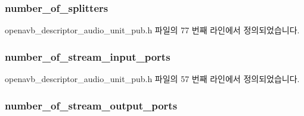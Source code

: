 \subsubsection[{\texorpdfstring{number\+\_\+of\+\_\+splitters}{number_of_splitters}}]{ number\+\_\+of\+\_\+splitters}\hypertarget{structopenavb__aem__descriptor__audio__unit__t_ac9c0b78b7351ae9f7719d899e40355d2}{}\label{structopenavb__aem__descriptor__audio__unit__t_ac9c0b78b7351ae9f7719d899e40355d2}


openavb\+\_\+descriptor\+\_\+audio\+\_\+unit\+\_\+pub.\+h 파일의 77 번째 라인에서 정의되었습니다.

\subsubsection[{\texorpdfstring{number\+\_\+of\+\_\+stream\+\_\+input\+\_\+ports}{number_of_stream_input_ports}}]{ number\+\_\+of\+\_\+stream\+\_\+input\+\_\+ports}\hypertarget{structopenavb__aem__descriptor__audio__unit__t_a96b944158688a4991f94f8e95558a744}{}\label{structopenavb__aem__descriptor__audio__unit__t_a96b944158688a4991f94f8e95558a744}


openavb\+\_\+descriptor\+\_\+audio\+\_\+unit\+\_\+pub.\+h 파일의 57 번째 라인에서 정의되었습니다.

\subsubsection[{\texorpdfstring{number\+\_\+of\+\_\+stream\+\_\+output\+\_\+ports}{number_of_stream_output_ports}}]{ number\+\_\+of\+\_\+stream\+\_\+output\+\_\+ports}\hypertarget{structopenavb__aem__descriptor__audio__unit__t_a4a61d0b1fa356cae2a9fdd3eda899be1}{}\label{structopenavb__aem__descriptor__audio__unit__t_a4a61d0b1fa356cae2a9fdd3eda899be1}



